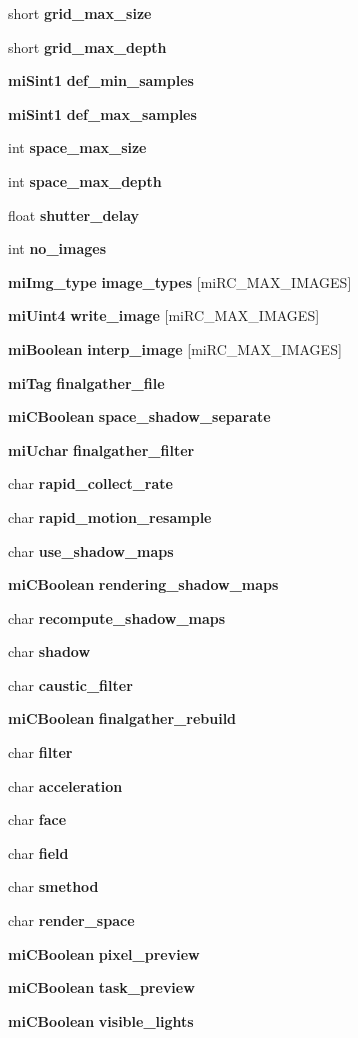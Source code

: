 \begin{CompactItemize}
short {\bf grid\_\-max\_\-size}
\item 
short {\bf grid\_\-max\_\-depth}
\item 
{\bf mi\-Sint1} {\bf def\_\-min\_\-samples}
\item 
{\bf mi\-Sint1} {\bf def\_\-max\_\-samples}
\item 
int {\bf space\_\-max\_\-size}
\item 
int {\bf space\_\-max\_\-depth}
\item 
float {\bf shutter\_\-delay}
\item 
int {\bf no\_\-images}
\item 
{\bf mi\-Img\_\-type} {\bf image\_\-types} [mi\-RC\_\-MAX\_\-IMAGES]
\item 
{\bf mi\-Uint4} {\bf write\_\-image} [mi\-RC\_\-MAX\_\-IMAGES]
\item 
{\bf mi\-Boolean} {\bf interp\_\-image} [mi\-RC\_\-MAX\_\-IMAGES]
\item 
{\bf mi\-Tag} {\bf finalgather\_\-file}
\item 
{\bf mi\-CBoolean} {\bf space\_\-shadow\_\-separate}
\item 
{\bf mi\-Uchar} {\bf finalgather\_\-filter}
\item 
char {\bf rapid\_\-collect\_\-rate}
\item 
char {\bf rapid\_\-motion\_\-resample}
\item 
char {\bf use\_\-shadow\_\-maps}
\item 
{\bf mi\-CBoolean} {\bf rendering\_\-shadow\_\-maps}
\item 
char {\bf recompute\_\-shadow\_\-maps}
\item 
char {\bf shadow}
\item 
char {\bf caustic\_\-filter}
\item 
{\bf mi\-CBoolean} {\bf finalgather\_\-rebuild}
\item 
char {\bf filter}
\item 
char {\bf acceleration}
\item 
char {\bf face}
\item 
char {\bf field}
\item 
char {\bf smethod}
\item 
char {\bf render\_\-space}
\item 
{\bf mi\-CBoolean} {\bf pixel\_\-preview}
\item 
{\bf mi\-CBoolean} {\bf task\_\-preview}
\item 
{\bf mi\-CBoolean} {\bf visible\_\-lights}
\item 

\end{CompactItemize}

